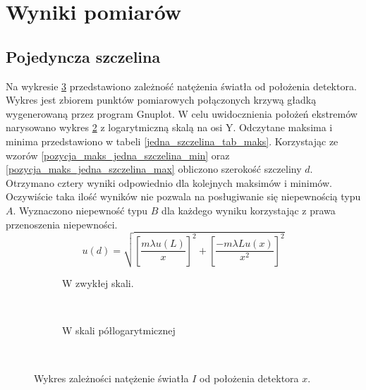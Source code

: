 \documentclass{article}
\begin{document}
\newpage
\section{Wyniki pomiarów}
\subsection{Pojedyncza szczelina}
Na wykresie \ref{jedna_szczelina_calosc} przedstawiono zależność natężenia światła od położenia detektora. Wykres jest zbiorem punktów pomiarowych połączonych krzywą gładką wygenerowaną przez program Gnuplot. W celu uwidocznienia położeń ekstremów narysowano wykres \ref{jedna_szczelina_log} z logarytmiczną skalą na osi Y. Odczytane maksima i minima przedstawiono w tabeli \ref{jedna_szczelina_tab_maks}. Korzystając ze wzorów \ref{pozycja_maks_jedna_szczelina_min} oraz \ref{pozycja_maks_jedna_szczelina_max} obliczono szerokość szczeliny $d$. Otrzymano cztery wyniki odpowiednio dla kolejnych maksimów i minimów. Oczywiście taka ilość wyników nie pozwala na posługiwanie się niepewnością typu $A$. Wyznaczono niepewność typu $B$ dla każdego wyniku korzystając z prawa przenoszenia niepewności.
\begin{equation*}
	u(d) = \sqrt{\left[\frac{m\lambda u(L)}{x} \right]^2 + \left[\frac{-m\lambda L u(x)}{x^2} \right]^2}
\end{equation*}
\begin{figure}[h!]
        \centering
        \begin{subfigure}[b]{\textwidth}
			\fontsize{6}{8}\selectfont %
			\centering
			\resizebox{0.9\textwidth}{!}{}		
			\caption{W zwykłej skali.}
			\label{jedna_szczelina}
        \end{subfigure}%
        ~ %
          
        \begin{subfigure}[b]{\textwidth}
			\fontsize{6}{8}\selectfont %
			\centering
			\resizebox{0.9\textwidth}{!}{}	
			\caption{W skali półlogarytmicznej}
			\label{jedna_szczelina_log}
        \end{subfigure}
        ~ %
        \caption{Wykres zależności natężenie światła $I$ od położenia detektora $x$.}\label{jedna_szczelina_calosc}
\end{figure}
\end{document}
